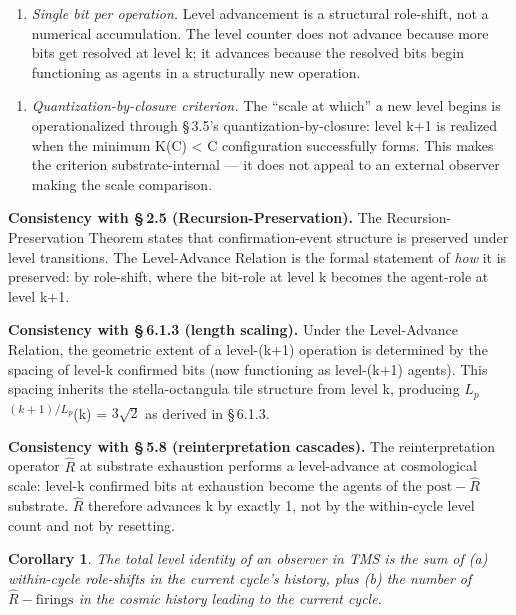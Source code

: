 \documentclass[11pt,oneside]{report}
\newtheorem{corollary}[theorem]{Corollary}
\theoremstyle{definition}
\theoremstyle{remark}
\begin{document}
\begin{enumerate}
\def\labelenumi{(\roman{enumi})}
\item
  \emph{Single bit per operation.} Level advancement is a structural
  role-shift, not a numerical accumulation. The level counter does not
  advance because more bits get resolved at level k; it advances because
  the resolved bits begin functioning as agents in a structurally new
  operation.
\end{enumerate}

\begin{enumerate}
\def\labelenumi{(\roman{enumi})}
\item
  \emph{Quantization-by-closure criterion.} The ``scale at which'' a new
  level begins is operationalized through \S\,3.5's
  quantization-by-closure: level k+1 is realized when the minimum K(C)
  \textless{} \textbar C\textbar{} configuration successfully forms.
  This makes the criterion substrate-internal --- it does not appeal to
  an external observer making the scale comparison.
\end{enumerate}

\textbf{Consistency with \S\,2.5 (Recursion-Preservation).} The
Recursion-Preservation Theorem states that confirmation-event structure
is preserved under level transitions. The Level-Advance Relation is the
formal statement of \emph{how} it is preserved: by role-shift, where the
bit-role at level k becomes the agent-role at level k+1.

\textbf{Consistency with \S\,6.1.3 (length scaling).} Under the
Level-Advance Relation, the geometric extent of a level-(k+1) operation
is determined by the spacing of level-k confirmed bits (now functioning
as level-(k+1) agents). This spacing inherits the stella-octangula tile
structure from level k, producing \ensuremath{L_{p}}\textsuperscript{\ensuremath{(k+1)/L_{p}}}(k) =
\ensuremath{3\sqrt{2}} as derived in \S\,6.1.3.

\textbf{Consistency with \S\,5.8 (reinterpretation cascades).} The
reinterpretation operator \ensuremath{\hat{R}} at substrate exhaustion performs a
level-advance at cosmological scale: level-k confirmed bits at
exhaustion become the agents of the \ensuremath{\text{post}-\hat{R}} substrate. \ensuremath{\hat{R}} therefore
advances k by exactly 1, not by the within-cycle level count and not by
resetting.

\begin{corollary}
The total level identity of an observer in TMS
is the sum of (a) within-cycle role-shifts in the current cycle's
history, plus (b) the number of \ensuremath{\hat{R}-\text{firings}} in the cosmic history leading
to the current cycle.
\end{corollary}
\end{document}
